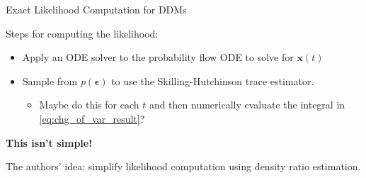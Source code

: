 \documentclass{beamer}
\begin{document}
\begin{frame}[allowframebreaks]{Exact Likelihood Computation for DDMs}
    \framebreak

    Steps for computing the likelihood:
    \begin{itemize}
        \item Apply an ODE solver to the probability flow ODE to solve for $\mathbf{x}(t)$
        \item Sample from $p(\mathbf{\epsilon})$ to use the Skilling-Hutchinson trace estimator.
        \begin{itemize}
            \item Maybe do this for each $t$ and then numerically evaluate the integral in \eqref{eq:chg_of_var_result}?
        \end{itemize}
    \end{itemize}
    \textbf{This isn't simple!}

    \medskip

    The authors' idea: simplify likelihood computation using density ratio estimation.
\end{frame}
\end{document}
